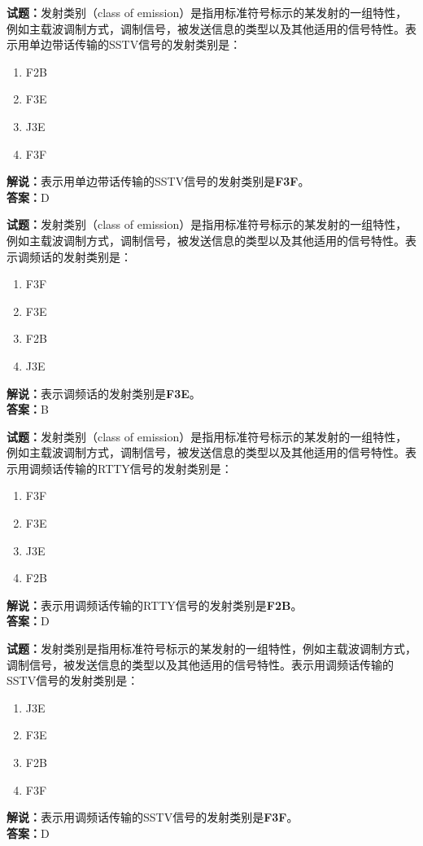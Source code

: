 \documentclass{ctexbook}
\begin{document}
\vspace{\baselineskip}

\noindent\textbf{试题：}发射类别（class of emission）是指用标准符号标示的某发射的一组特性，例如主载波调制方式，调制信号，被发送信息的类型以及其他适用的信号特性。表示用单边带话传输的SSTV信号的发射类别是：
\begin{enumerate}[leftmargin=3em]
  \item F2B
  \item F3E
  \item J3E
  \item F3F
\end{enumerate}
\noindent\textbf{解说：}表示用单边带话传输的SSTV信号的发射类别是\textbf{F3F}。\\\noindent\textbf{答案：}D

\vspace{\baselineskip}

\noindent\textbf{试题：}发射类别（class of emission）是指用标准符号标示的某发射的一组特性，例如主载波调制方式，调制信号，被发送信息的类型以及其他适用的信号特性。表示调频话的发射类别是：
\begin{enumerate}[leftmargin=3em]
  \item F3F
  \item F3E
  \item F2B
  \item J3E
\end{enumerate}
\noindent\textbf{解说：}表示调频话的发射类别是\textbf{F3E}。\\\noindent\textbf{答案：}B

\vspace{\baselineskip}

\noindent\textbf{试题：}发射类别（class of emission）是指用标准符号标示的某发射的一组特性，例如主载波调制方式，调制信号，被发送信息的类型以及其他适用的信号特性。表示用调频话传输的RTTY信号的发射类别是：
\begin{enumerate}[leftmargin=3em]
  \item F3F
  \item F3E
  \item J3E
  \item F2B
\end{enumerate}
\noindent\textbf{解说：}表示用调频话传输的RTTY信号的发射类别是\textbf{F2B}。\\\noindent\textbf{答案：}D

\vspace{\baselineskip}

\noindent\textbf{试题：}发射类别是指用标准符号标示的某发射的一组特性，例如主载波调制方式，调制信号，被发送信息的类型以及其他适用的信号特性。表示用调频话传输的SSTV信号的发射类别是：
\begin{enumerate}[leftmargin=3em]
  \item J3E
  \item F3E
  \item F2B
  \item F3F
\end{enumerate}
\noindent\textbf{解说：}表示用调频话传输的SSTV信号的发射类别是\textbf{F3F}。\\\noindent\textbf{答案：}D
\end{document}
